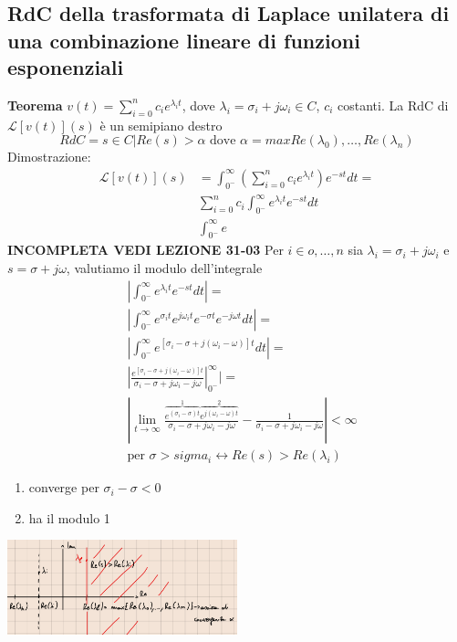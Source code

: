 \documentclass[a4paper, 12pt]{book}
\theoremstyle{plain}
\begin{document}
\subsection{RdC della trasformata di Laplace unilatera di una combinazione lineare di funzioni esponenziali}

\textbf{Teorema} $v(t) = \sum_{i = 0}^n c_i e^{\lambda_i t}$, dove $\lambda_i = \sigma_i + j \omega_i \in C$, $c_i$ costanti.
La RdC di $\mathcal{L} [v(t)] (s)$ è un semipiano destro 
\[
    RdC = { s \in C | Re(s) > \alpha} \textrm{ dove } \alpha = max{Re(\lambda_0), \dots, Re(\lambda_n)}
\]
Dimostrazione:
\[
    \begin{split}
        \mathcal{L} [v(t)] (s) &= \int_{0^-}^\infty (\sum_{i = 0}^n c_i e^{\lambda_i t}) e^{-st} dt = \\
        &\sum_{i = 0}^n c_i \int_{0^-}^\infty e^{\lambda_i t} e^{-st} dt \\
        &\int_{0^-}^\infty e^{}
    \end{split}
\]
\textbf{INCOMPLETA VEDI LEZIONE 31-03}
Per $i \in {o, \dots, n}$ sia $\lambda_i = \sigma_i + j\omega_i$ e $s = \sigma + j\omega$, valutiamo il modulo dell'integrale 
\[
    \begin{split}
        &| \int_{0^-}^\infty e^{\lambda_i t} e^{-st} dt | = \\
        &| \int_{0^-}^\infty e^{\sigma_i t} e^{j \omega_i t} e^{-\sigma t} e^{-j\omega t} dt | = \\
        &| \int_{0^-}^\infty e^{[\sigma_i - \sigma + j(\omega_i - \omega)]t} dt | = \\
        &| \frac{e^{[\sigma_i - \sigma + j(\omega_i - \omega)]t}}{\sigma_i - \sigma + j\omega_i - j\omega} |_{0^-}^\infty | = \\
        &| \lim_{t \rightarrow \infty} \frac{\overbrace{e^{(\sigma_i - \sigma)t}}^1 \overbrace{e^{j(\omega_i - \omega)t}}^2}{\sigma_i - \sigma + j\omega_i - j\omega} - \frac{1}{\sigma_i - \sigma + j\omega_i - j\omega} | < \infty \\
        & \textrm{per } \sigma > sigma_i \leftrightarrow Re(s) > Re(\lambda_i)
    \end{split}
\]
\begin{enumerate}
    \item converge per $\sigma_i - \sigma < 0$
    \item ha il modulo 1
\end{enumerate}
\begin{center}
    \includegraphics[width=0.5\textwidth]{RdC2.png}
\end{center}
\end{document}
